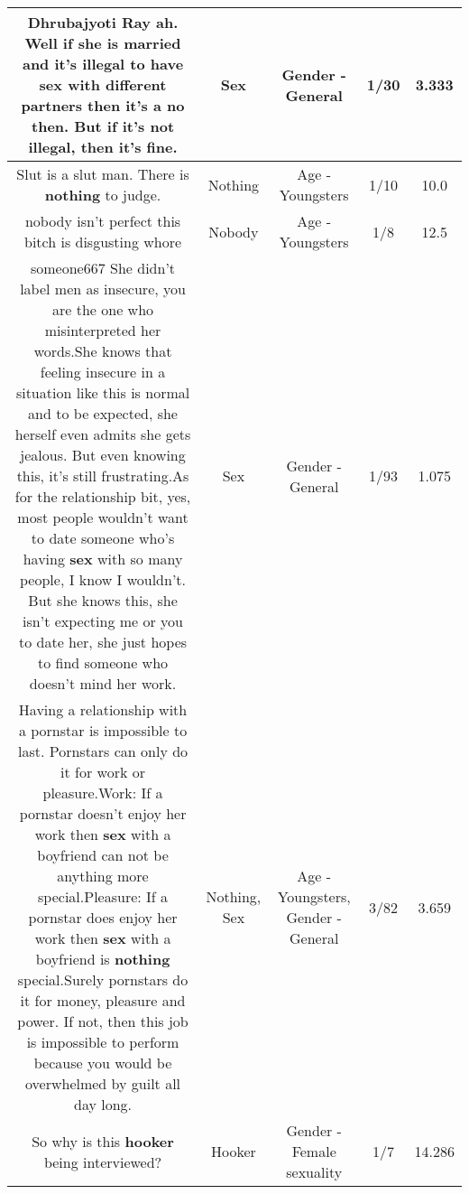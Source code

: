 \documentclass[11pt]{article}
\newlength\mylength
\begin{document}
\begin{center}
\begin{longtable}{|C{.65\mylength}|C{.30\mylength}|C{.12\mylength}|C{.12\mylength}|C{.12\mylength}|}
  \small Dhrubajyoti Ray ah. Well if she is married and it's illegal to have \textbf{sex} with different partners then it's a no then. But if it's not illegal, then it's fine.\normalsize   & Sex & Gender - General & 1/30 & 3.333 \\  \hline
  \small Slut is a slut man. There is \textbf{nothing} to judge.\normalsize   & Nothing & Age - Youngsters & 1/10 & 10.0 \\  \hline
  \small nobody isn't perfect this bitch is disgusting whore\normalsize   & Nobody & Age - Youngsters & 1/8 & 12.5 \\  \hline
  \small someone667 She didn't label men as insecure, you are the one who misinterpreted her words.She knows that feeling insecure in a situation like this is normal and to be expected, she herself even admits she gets jealous. But even knowing this, it's still frustrating.As for the relationship bit, yes, most people wouldn't want to date someone who's having \textbf{sex} with so many people, I know I wouldn't. But she knows this, she isn't expecting me or you to date her, she just hopes to find someone who doesn't mind her work.\normalsize   & Sex & Gender - General & 1/93 & 1.075 \\  \hline
  \small Having a relationship with a pornstar is impossible to last. Pornstars can only do it for work or pleasure.Work: If a pornstar doesn't enjoy her work then \textbf{sex} with a boyfriend can not be anything more special.Pleasure: If a pornstar does enjoy her work then \textbf{sex} with a boyfriend is \textbf{nothing} special.Surely pornstars do it for money, pleasure and power. If not, then this job is impossible to perform because you would be overwhelmed by guilt all day long.\normalsize   & Nothing, Sex & Age - Youngsters, Gender - General & 3/82 & 3.659 \\  \hline
  \small So why is this \textbf{hooker} being interviewed?\normalsize   & Hooker & Gender - Female sexuality & 1/7 & 14.286 \\  \hline

\end{longtable}
\end{center}
\end{document}
